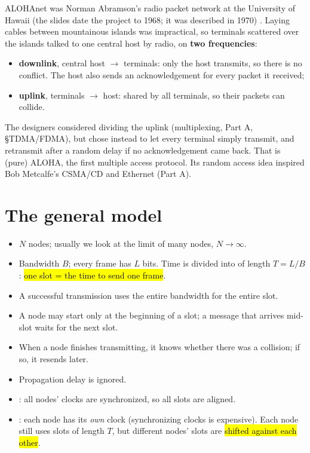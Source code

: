 ALOHAnet was Norman Abramson's radio packet network at the University of Hawaii (the slides date the project to 1968; it was described in 1970) .
Laying cables between mountainous islands was impractical, so terminals scattered over the islands talked to one central host by radio, on \textbf{two frequencies}:
\begin{itemize}
  \item \textbf{downlink}, central host $\to$ terminals: only the host transmits, so there is no conflict. The host also sends an acknowledgement for every packet it received;
  \item \textbf{uplink}, terminals $\to$ host: shared by all terminals, so their packets can collide.
\end{itemize}
The designers considered dividing the uplink (multiplexing, Part A, \S TDMA/FDMA), but chose instead to let every terminal simply transmit, and retransmit after a random delay if no acknowledgement came back.
That is (pure) ALOHA, the first multiple access protocol. Its random access idea inspired Bob Metcalfe's CSMA/CD and Ethernet (Part A).

\section{The general model}

\begin{defn}
\begin{itemize}
  \item $N$ nodes; usually we look at the limit of many nodes, $N\to\infty$.
  \item Bandwidth $B$; every frame has $L$ bits. Time is divided into  of length $T = L/B$: \hl{one slot = the time to send one frame}.
  \item A successful transmission uses the entire bandwidth for the entire slot.
  \item A node may start only at the beginning of a slot; a message that arrives mid-slot waits for the next slot.
  \item When a node finishes transmitting, it knows whether there was a collision; if so, it resends later.
  \item Propagation delay is ignored.
\end{itemize}
\end{defn}

\begin{defn}
\begin{itemize}
  \item {}: all nodes' clocks are synchronized, so all slots are aligned.
  \item {}: each node has its \emph{own} clock (synchronizing clocks is expensive). Each node still uses slots of length $T$, but different nodes' slots are \hl{shifted against each other}.
\end{itemize}
\end{defn}

